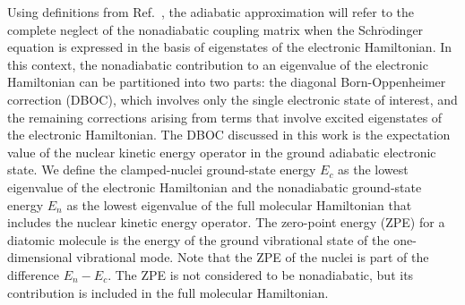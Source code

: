 Using definitions from Ref.~\cite{Cederbaum_Review}, the adiabatic approximation will refer to the complete neglect of the nonadiabatic coupling matrix when the Schr$\ddot{\text{o}}$dinger equation is expressed in the basis of eigenstates of the electronic Hamiltonian. In this context, the nonadiabatic contribution to an eigenvalue of the electronic Hamiltonian can be partitioned into two parts: the diagonal Born-Oppenheimer correction (DBOC), which involves only the single electronic state of interest, and the remaining corrections arising from terms that involve excited eigenstates of the electronic Hamiltonian. The DBOC discussed in this work is the expectation value of the nuclear kinetic energy operator in the ground adiabatic electronic state. We define the clamped-nuclei ground-state energy $E_c$ as the lowest eigenvalue of the electronic Hamiltonian and the nonadiabatic ground-state energy $E_n$ as the lowest eigenvalue of the full molecular Hamiltonian that includes the nuclear kinetic energy operator. The zero-point energy (ZPE) for a diatomic molecule is the energy of the ground vibrational state of the one-dimensional vibrational mode. Note that the ZPE of the nuclei is part of the difference $E_n-E_c$. The ZPE is not considered to be nonadiabatic, but its contribution is included in the full molecular Hamiltonian.

